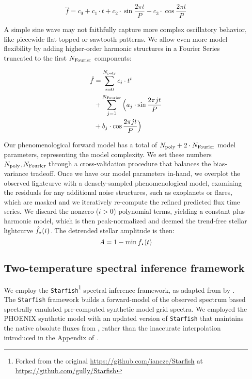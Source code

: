 \documentclass[twocolumn]{emulateapj}%
\begin{document}
\begin{equation}
\hat f = c_0 + c_1 \cdot t + c_2 \cdot \sin{\frac{2\pi t}{P}} + c_3 \cdot \cos{\frac{2\pi t}{P}}
\end{equation}

A simple sine wave may not faithfully capture more complex oscillatory behavior, like piecewide flat-topped or sawtooth patterns.  We allow even more model flexibility by adding higher-order harmonic structures in a Fourier Series \citep{vanderplas15a} truncated to the first $N_{\rm Fourier}$ components:

\begin{equation} \label{eqn:Fourier}
  \begin{split}
 \hat f  & =  \sum_{i=0}^{N_{\rm poly}} c_i \cdot t^i \\
         & + \sum_{j=1}^{N_{\rm Fourier}} \Big( a_j \cdot \sin{\frac{2\pi j t}{P}} \\
         & + b_j \cdot \cos{\frac{2\pi j t}{P}} \Big)
\end{split}
\end{equation}

Our phenomenological forward model has a total of $N_{\rm poly}+2 \cdot N_{\rm Fourier}$ model parameters, representing the model complexity.  We set these numbers $N_{\rm poly}, N_{\rm Fourier}$ through a cross-validation procedure that balances the bias-variance tradeoff.  Once we have our model parameters in-hand, we overplot the observed lightcurve with a densely-sampled phenomenological model, examining the residuals for any additional noise structures, such as exoplanets or flares, which are masked and we iteratively re-compute the refined predicted flux time series.  We discard the nonzero ($i>0$) polynomial terms, yielding a constant plus harmonic model, which is then peak-normalized and deemed the trend-free stellar lightcurve $\hat f_{\rm \star}(t)$.  The detrended stellar amplitude is then: $$ A = 1 - \min{f_{\rm \star}(t)}$$

\subsection{Two-temperature spectral inference framework}

We employ the \texttt{Starfish}\footnote{Forked from the original \url{https://github.com/iancze/Starfish} at \url{https://github.com/gully/Starfish}} \citep{czekala15} spectral inference framework, as adapted from  by \citet{2017ApJ...836..200G}.  The \texttt{Starfish} framework builds a forward-model of the observed spectrum based spectrally emulated pre-computed synthetic model grid spectra.  We employed the PHOENIX synthetic model with an updated version of \texttt{Starfish} that maintains the native absolute fluxes from \citet{husser13}, rather than the inaccurate interpolation introduced in the Appendix of \citet{2017ApJ...836..200G}.
\end{document}
